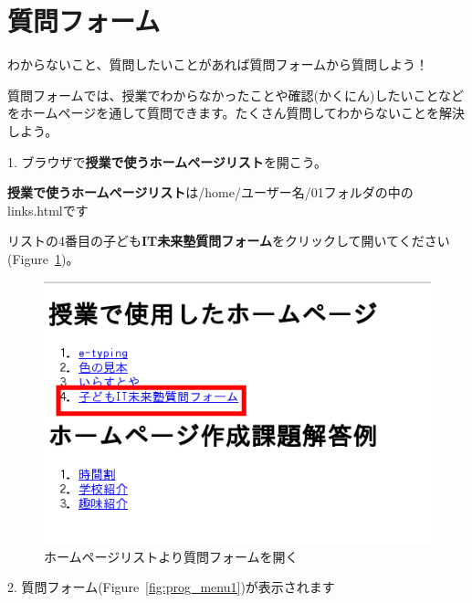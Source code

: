 \newpage
\section{質問フォーム}

わからないこと、質問したいことがあれば質問フォームから質問しよう！

質問フォームでは、授業でわからなかったことや確認(かくにん)したいことなどをホームページを通して質問できます。たくさん質問してわからないことを解決しよう。

1.
ブラウザで\textbf{授業で使うホームページリスト}を開こう。

\textbf{授業で使うホームページリスト}は/home/ユーザー名/01フォルダの中のlinks.htmlです

リストの4番目の子ども\textbf{IT未来塾質問フォーム}をクリックして開いてください(Figure~\ref{fig:prog_menu0})。


\begin{description}
    \item {}
\end{description}

\begin{figure}[H]
    \begin{center}
      \includegraphics[width=11.231cm,height=7.613cm]{text04-img/textbook-img245.png}
      \caption{ホームページリストより質問フォームを開く}
    \end{center}
    \label{fig:prog_menu0}
\end{figure}

2.
質問フォーム(Figure~\ref{fig:prog_menu1})が表示されます

